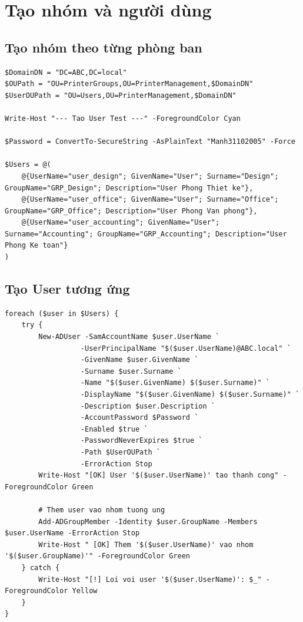 \chapter{\textbf{Tạo nhóm và người dùng}}
\section{Tạo nhóm theo từng phòng ban}

\begin{lstlisting}[style=powershell]
$DomainDN = "DC=ABC,DC=local"
$OUPath = "OU=PrinterGroups,OU=PrinterManagement,$DomainDN"
$UserOUPath = "OU=Users,OU=PrinterManagement,$DomainDN"

Write-Host "--- Tao User Test ---" -ForegroundColor Cyan

$Password = ConvertTo-SecureString -AsPlainText "Manh31102005" -Force

$Users = @(
    @{UserName="user_design"; GivenName="User"; Surname="Design"; GroupName="GRP_Design"; Description="User Phong Thiet ke"},
    @{UserName="user_office"; GivenName="User"; Surname="Office"; GroupName="GRP_Office"; Description="User Phong Van phong"},
    @{UserName="user_accounting"; GivenName="User"; Surname="Accounting"; GroupName="GRP_Accounting"; Description="User Phong Ke toan"}
)
\end{lstlisting}

\section{Tạo User tương ứng}

\begin{lstlisting}[style=powershell]
foreach ($user in $Users) {
    try {
        New-ADUser -SamAccountName $user.UserName `
                  -UserPrincipalName "$($user.UserName)@ABC.local" `
                  -GivenName $user.GivenName `
                  -Surname $user.Surname `
                  -Name "$($user.GivenName) $($user.Surname)" `
                  -DisplayName "$($user.GivenName) $($user.Surname)" `
                  -Description $user.Description `
                  -AccountPassword $Password `
                  -Enabled $true `
                  -PasswordNeverExpires $true `
                  -Path $UserOUPath `
                  -ErrorAction Stop
        Write-Host "[OK] User '$($user.UserName)' tao thanh cong" -ForegroundColor Green
        
        # Them user vao nhom tuong ung
        Add-ADGroupMember -Identity $user.GroupName -Members $user.UserName -ErrorAction Stop
        Write-Host " [OK] Them '$($user.UserName)' vao nhom '$($user.GroupName)'" -ForegroundColor Green
    } catch {
        Write-Host "[!] Loi voi user '$($user.UserName)': $_" -ForegroundColor Yellow
    }
}
\end{lstlisting}

